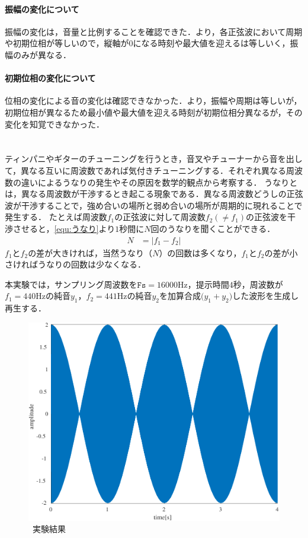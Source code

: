\paragraph{振幅の変化について} 振幅の変化は，音量と比例することを確認できた．より，各正弦波において周期や初期位相が等しいので，縦軸が\(0\)になる時刻や最大値を迎えるは等しいく，振幅のみが異なる．
\paragraph{初期位相の変化について} 位相の変化による音の変化は確認できなかった．より，振幅や周期は等しいが，初期位相が異なるため最小値や最大値を迎える時刻が初期位相分異なるが，その変化を知覚できなかった．
\section{\kadaiac}\label{sec:\kadaiac}
\purpose
ティンパニやギターのチューニングを行うとき，音叉やチューナーから音を出して，異なる互いに周波数であれば気付きチューニングする．それぞれ異なる周波数の違いによるうなりの発生やその原因を数学的観点から考察する．
\method
うなりとは，異なる周波数が干渉するとき起こる現象である．異なる周波数どうしの正弦波が干渉することで，強め合いの場所と弱め合いの場所が周期的に現れることで発生する．
たとえば周波数\(f_1\)の正弦波に対して周波数\(f_2(\neq f_1)\)の正弦波を干渉させると，\eqref{equ:うなり}より\(1\)秒間に\(N\)回のうなりを聞くことができる．
\begin{align}
    N & = \big|f_1-f_2\big|\label{equ:うなり}
\end{align}
\(f_1\)と\(f_2\)の差が大きければ，当然うなり（\(N\)）の回数は多くなり，\(f_1\)と\(f_2\)の差が小さければうなりの回数は少なくなる．\par
本実験では，サンプリング周波数を\(\texttt{Fs}=16000\textrm{Hz}\)，提示時間\(4\)秒，周波数が\(f_1=440\textrm{Hz}\)の純音\(y_1\)，\(f_2=441\textrm{Hz}\)の純音\(y_2\)を加算合成\(\big(y_1+y_2\big)\)した波形を生成し再生する．\\
\begin{figure}
    \centering
    \includegraphics[keepaspectratio,width=.3\textwidth]{../../Figures/01_03.pdf}
    \caption{\kadaiac\ 実験結果}
    \label{fig:\kadaiac_実験結果}
\end{figure}
